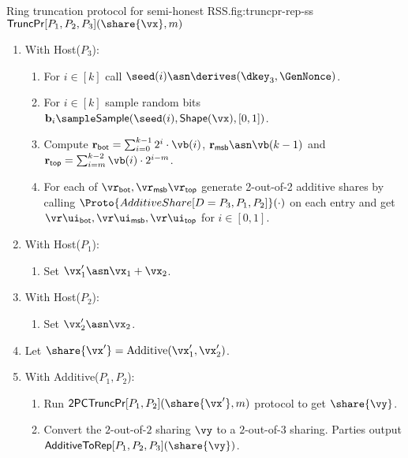 \begin{Boxfig}{Ring truncation protocol for semi-honest
RSS.}{fig:truncpr-rep-ss}{$\mathsf{TruncPr}{[P_1, P_2, P_3]}(\share{\vx}, m)$}
\begin{enumerate}
  \item With Host($P_3$):
  \begin{enumerate}
    \item For $i \in [k]$ call $\seed(i) \asn \derives(\dkey_3, \GenNonce)$.
    \item For $i \in [k]$ sample random bits $\mathbf{b}_i \sample \mathsf{Sample}(\seed(i), \mathsf{Shape}(\vx), [0,1])$.
    \item Compute
    $\mathbf{r}_{\mathsf{bot}} = \sum_{i=0}^{k-1}2^i \cdot \vb(i)$,
    $\mathbf{r}_{\mathsf{msb}} \asn \vb(k-1)$ and
    $\mathbf{r}_{\mathsf{top}} = \sum_{i=m}^{k-2} \vb(i) \cdot 2^{i-m}$.
    \item For each of $\vr_{\mathsf{bot}}, \vr_{\mathsf{msb}} \vr_{\mathsf{top}}$
    generate 2-out-of-2 additive shares by calling $\Proto{AdditiveShare[D=P_3, P_1, P_2]}(\cdot)$
    on each entry and get $
    \vr\ui_{\mathsf{bot}}, \vr\ui_{\mathsf{msb}}, \vr\ui_{\mathsf{top}}$ for $i \in [0,1]$.
 \end{enumerate}
\item With Host($P_1$):
\begin{enumerate}
  \item Set $\vx'_1 \asn \vx_1 + \vx_2$.
\end{enumerate}

\item With Host($P_2$):
\begin{enumerate}
    \item Set $\vx'_2 \asn \vx_2$.
\end{enumerate}
\item Let $\share{\vx'} = \text{Additive}(\vx'_1, \vx'_2)$.

\item With Additive($P_1, P_2$):
\begin{enumerate}
   \item Run $\textsf{2PCTruncPr}[P_1, P_2](\share{\vx'}, m)$ protocol to get $\share{\vy}$.
  \item Convert the $2$-out-of-$2$ sharing $\vy$ to a $2$-out-of-$3$
 sharing. Parties output $\textsf{AdditiveToRep}[P_1, P_2, P_3](\share{\vy})$.
\end{enumerate}
\end{enumerate}

\end{Boxfig}

